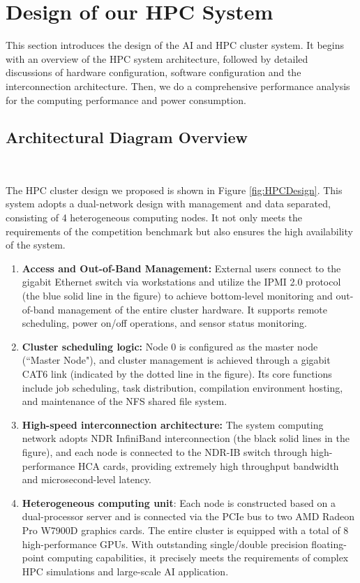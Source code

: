 \section{Design of our HPC System}
This section introduces the design of the AI and HPC cluster system.
It begins with an overview of the HPC system architecture, followed by detailed discussions of hardware configuration, software configuration and the interconnection architecture.
Then, we do a comprehensive performance analysis for the computing performance and power consumption.

\subsection{Architectural Diagram Overview}%
\

The HPC cluster design we proposed is shown in Figure \ref{fig:HPCDesign}.
This system adopts a dual-network design with management and data separated, consisting of 4 heterogeneous computing nodes. 
It not only meets the requirements of the competition benchmark but also ensures the high availability of the system. 
\begin{enumerate}
    \item \textbf{Access and Out-of-Band Management: }External users connect to the gigabit Ethernet switch via workstations and utilize the IPMI 2.0 protocol (the blue solid line in the figure) to achieve bottom-level monitoring and out-of-band management of the entire cluster hardware. 
    It supports remote scheduling, power on/off operations, and sensor status monitoring. 
    \item \textbf{Cluster scheduling logic:} Node 0 is configured as the master node (``Master Node"), and cluster management is achieved through a gigabit CAT6 link (indicated by the dotted line in the figure). 
    Its core functions include job scheduling, task distribution, compilation environment hosting, and maintenance of the NFS shared file system. 
    \item \textbf{High-speed interconnection architecture:} The system computing network adopts NDR InfiniBand interconnection (the black solid lines in the figure), and each node is connected to the NDR-IB switch through high-performance HCA cards, providing extremely high throughput bandwidth and microsecond-level latency. 
    \item \textbf{Heterogeneous computing unit}: Each node is constructed based on a dual-processor server and is connected via the PCIe bus to two AMD Radeon Pro W7900D graphics cards. 
    The entire cluster is equipped with a total of 8 high-performance GPUs. 
    With outstanding single/double precision floating-point computing capabilities, it precisely meets the requirements of complex HPC simulations and large-scale AI application.
\end{enumerate}




